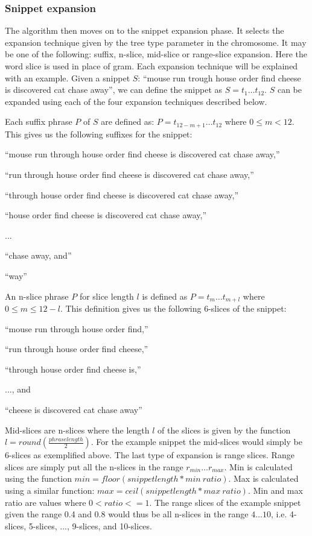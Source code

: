 \subsubsection{Snippet expansion}
The algorithm then moves on to the snippet expansion phase. It selects the expansion technique given by the tree type parameter in the chromosome. It may be one of the following: suffix, n-slice, mid-slice or range-slice expansion. Here the word slice is used in place of gram. Each expansion technique will be explained with an example. Given a snippet \(S\): ``mouse run trough house order find cheese is discovered cat chase away'', we can define the snippet as \(S = t_{1} \dots t_{12}\). \(S\) can be expanded using each of the four expansion techniques described below.

Each suffix phrase \(P\)  of \(S\) are defined as: \(P = t_{12-m+1} \dots t_{12}\) where \(0 \le m < 12\). This gives us the following suffixes for the snippet:
\begin{inparaenum}[\itshape 1\upshape)]
\item ``mouse run through house order find cheese is discovered cat chase away,''
\item ``run through house order find cheese is discovered cat chase away,''
\item ``through house order find cheese is discovered cat chase away,''
\item ``house order find cheese is discovered cat chase away,''
\item ...
\item ``chase away, and''
\item ``way''
\end{inparaenum}


An n-slice phrase \(P\) for slice length \(l\) is defined as \(P = t_{m} \dots t_{m+l}\) where \(0 \le m \le 12 - l\). This definition gives us the following 6-slices of the snippet:
\begin{inparaenum}[\itshape 1\upshape)]
\item ``mouse run through house order find,''
\item ``run through house order find cheese,''
\item ``through house order find cheese is,''
\item ..., and
\item ``cheese is discovered cat chase away''
\end{inparaenum}

Mid-slices are n-slices where the length \(l\) of the slices is given by the function \(l = round(\frac{phraselength}{2})\). For the example snippet the mid-slices would simply be 6-slices as exemplified above. The last type of expansion is range slices. Range slices are simply put all the n-slices in the range \(r_{min} \dots r_{max}\). Min is calculated using the function \(min = floor(snippet length * min~ratio)\). Max is calculated using a similar function: \(max = ceil(snippet length * max~ratio)\).  Min and max ratio are values where \(0 < ratio <= 1\). The range slices of the example snippet given the range 0.4 and 0.8 would thus be all n-slices in the range \(4 \dots 10\), i.e. 4-slices, 5-slices, ..., 9-slices, and 10-slices.

